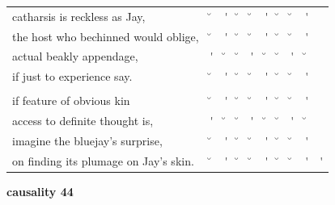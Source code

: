 \documentclass[12pt, landscape]{article}
\begin{document}
\begin{center}
\begin{tabularx}{\textwidth}{
>{\lefting\arraybackslash}X
c
c
c
c
c
c
c
c
c
}

catharsis is reckless as Jay, & \u{} & \'{} & \u{} & \u{} & \'{} & \u{} & \u{} & \'{} & \\
the host who bechinned would oblige, & \u{} & \'{} & \u{} & \u{} & \'{} & \u{} & \u{} & \'{} & \\
actual beakly appendage, & \'{} & \u{} & \u{} & \'{} & \u{} & \u{} & \'{} & \u{} & \\
if just to experience say. & \u{} & \'{} & \u{} & \u{} & \'{} & \u{} & \u{} & \'{} & \\
 & & & & & & & & \\
if feature of obvious kin & \u{} & \'{} & \u{} & \u{} & \'{} & \u{} & \u{} & \'{} & \\
access to definite thought is, & \'{} & \u{} & \u{} & \'{} & \u{} & \u{} & \'{} & \u{} & \\
imagine the bluejay's surprise, & \u{} & \'{} & \u{} & \u{} & \'{} & \u{} & \u{} & \'{} & \\
on finding its plumage on Jay's skin. & \u{} & \'{} & \u{} & \u{} & \'{} & \u{} & \u{} & \'{} & \'{} \\

\end{tabularx}
\end{center}

\vspace*{\fill}

\newpage

\vspace*{\fill}

\noindent \textbf{causality 44}
\noindent \hfill \par
\end{document}
